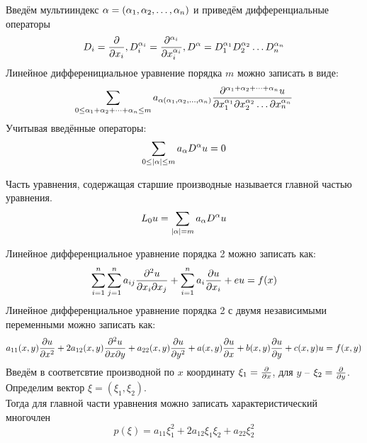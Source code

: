 \documentclass[../main.tex]{subfiles}
\begin{document}
Введём мультииндекс $\alpha = (\alpha_1,\alpha_2,\dots,\alpha_n)$ и приведём дифференциальные операторы
\[D_i=\frac{\partial  }{\partial x_i},D^{\alpha_i}_i=\frac{\partial ^{\alpha_i }}{\partial x_i^{\alpha_i}}, D^\alpha = D^{\alpha_1}_1 D^{\alpha_2}_2\dots D^{\alpha_n}_n\]
Линейное дифференициальное уравнение порядка $m$ можно записать в виде:
\[
	\sum_{0 \leq \alpha_1+\alpha_2+\dots+\alpha_n \leq m}
	a_{\alpha(\alpha_1, \alpha_2, \dots, \alpha_n)}
	\frac{\partial ^{\alpha_1+\alpha_2+\dots+\alpha_n}u}{\partial x_1^{\alpha_1} \partial{x_2^{\alpha_2}} \dots \partial{x_n^{\alpha_n}}}
\]
Учитывая введённые операторы:
\[
	\sum_{0 \leq |\alpha| \leq m}a_\alpha D^\alpha u = 0
\]

\begin{definition}
	Часть уравнения, содержащая старшие производные называется
	главной частью уравнения.
	\[L_0u = \sum_{|\alpha|=m} a_\alpha D^\alpha u\]
\end{definition}
Линейное дифференциальное уравнение порядка 2 можно записать как:
\[
	\sum^n_{i=1}\sum^n_{j=1}a_{ij}\frac{\partial ^2u}{\partial x_i \partial{x_j}} + 
	\sum^n_{i=1}a_i\frac{\partial u}{\partial x_i} + eu = f(x)
\]
Линейное дифференциальное уравнение порядка 2 с двумя 
независимыми переменными можно записать как:
\begin{equation}
	\label{eq:1.1} %
	a_{11}(x,y)\pderiv{u}{x^2} + 2a_{12}(x,y)\pderiv{^2u}{x \partial{y}} +
	a_{22}(x,y)\pderiv{u}{y^2} + a(x,y)\pderiv{u}{x} + b(x,y)\pderiv{u}{y} + c(x,y)u = f(x,y)
\end{equation}
Введём в соответсвтие производной по $x$ координату $\xi_1=\frac{\partial  }{\partial x}$,
для $y$ -- $\xi_2 = \frac{\partial  }{\partial y}$. Определим вектор $\xi=(\xi_1, \xi_2)$.\\
Тогда для главной части уравнения можно записать характеристический многочлен
\[
	p(\xi)=a_{11}\xi_1^2 + 2a_{12}\xi_1\xi_2 + a_{22}\xi_2^2
\]
\end{document}
